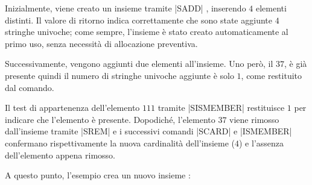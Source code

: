 Inizialmente, viene creato un insieme tramite \cverb|SADD| , inserendo $4$ elementi
distinti. Il valore di ritorno indica correttamente che sono state aggiunte $4$ stringhe univoche;
come sempre, l'insieme è stato creato automaticamente al primo uso, senza necessità di allocazione
preventiva.

\begin{center}
\end{center}

Successivamente, vengono aggiunti due elementi all'insieme. Uno però, il $37$, è già presente
quindi il numero di stringhe univoche aggiunte è solo $1$, come restituito dal comando.

\begin{center}
\end{center}

Il test di appartenenza dell'elemento $111$ tramite \cverb|SISMEMBER|  restituisce $1$ per 
indicare che l'elemento è presente. Dopodiché, l'elemento $37$ viene rimosso dall'insieme tramite
\cverb|SREM|  e i successivi comandi \cverb|SCARD| e \cverb|ISMEMBER| confermano 
rispettivamente la nuova cardinalità dell'insieme ($4$) e l'assenza dell'elemento appena rimosso.

\begin{center}
\end{center}

A questo punto, l'esempio crea un nuovo insieme : 

